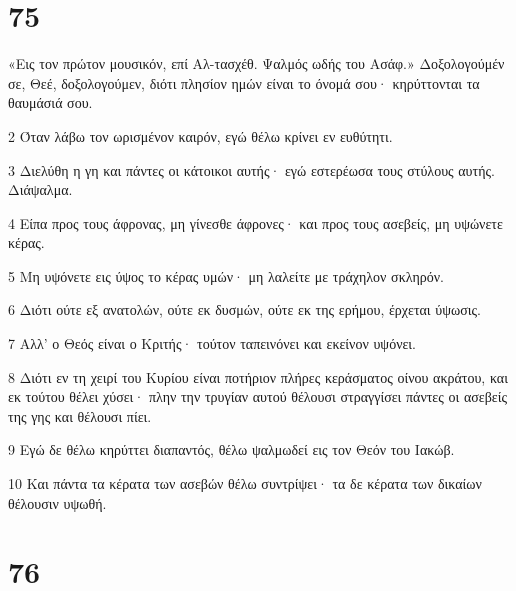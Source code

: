 \chapter{75}

\par «Εις τον πρώτον μουσικόν, επί Αλ-τασχέθ. Ψαλμός ωδής του Ασάφ.» Δοξολογούμέν σε, Θεέ, δοξολογούμεν, διότι πλησίον ημών είναι το όνομά σου· κηρύττονται τα θαυμάσιά σου.
\par 2 Όταν λάβω τον ωρισμένον καιρόν, εγώ θέλω κρίνει εν ευθύτητι.
\par 3 Διελύθη η γη και πάντες οι κάτοικοι αυτής· εγώ εστερέωσα τους στύλους αυτής. Διάψαλμα.
\par 4 Είπα προς τους άφρονας, μη γίνεσθε άφρονες· και προς τους ασεβείς, μη υψώνετε κέρας.
\par 5 Μη υψόνετε εις ύψος το κέρας υμών· μη λαλείτε με τράχηλον σκληρόν.
\par 6 Διότι ούτε εξ ανατολών, ούτε εκ δυσμών, ούτε εκ της ερήμου, έρχεται ύψωσις.
\par 7 Αλλ' ο Θεός είναι ο Κριτής· τούτον ταπεινόνει και εκείνον υψόνει.
\par 8 Διότι εν τη χειρί του Κυρίου είναι ποτήριον πλήρες κεράσματος οίνου ακράτου, και εκ τούτου θέλει χύσει· πλην την τρυγίαν αυτού θέλουσι στραγγίσει πάντες οι ασεβείς της γης και θέλουσι πίει.
\par 9 Εγώ δε θέλω κηρύττει διαπαντός, θέλω ψαλμωδεί εις τον Θεόν του Ιακώβ.
\par 10 Και πάντα τα κέρατα των ασεβών θέλω συντρίψει· τα δε κέρατα των δικαίων θέλουσιν υψωθή.

\chapter{76}

